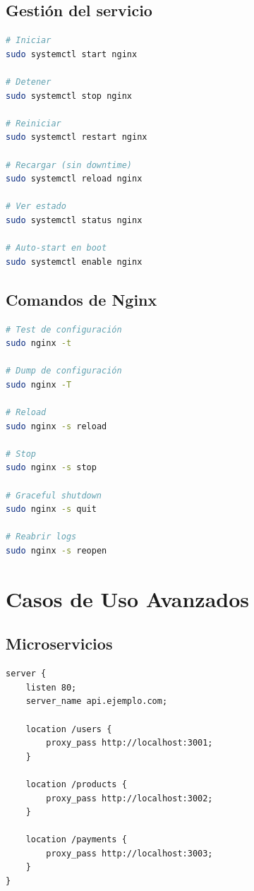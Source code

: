 \documentclass[11pt,a4paper]{article}
\begin{document}
\subsection{Gestión del servicio}

\begin{lstlisting}[language=bash]
# Iniciar
sudo systemctl start nginx

# Detener
sudo systemctl stop nginx

# Reiniciar
sudo systemctl restart nginx

# Recargar (sin downtime)
sudo systemctl reload nginx

# Ver estado
sudo systemctl status nginx

# Auto-start en boot
sudo systemctl enable nginx
\end{lstlisting}

\subsection{Comandos de Nginx}

\begin{lstlisting}[language=bash]
# Test de configuración
sudo nginx -t

# Dump de configuración
sudo nginx -T

# Reload
sudo nginx -s reload

# Stop
sudo nginx -s stop

# Graceful shutdown
sudo nginx -s quit

# Reabrir logs
sudo nginx -s reopen
\end{lstlisting}

\section{Casos de Uso Avanzados}

\subsection{Microservicios}

\begin{lstlisting}
server {
    listen 80;
    server_name api.ejemplo.com;
    
    location /users {
        proxy_pass http://localhost:3001;
    }
    
    location /products {
        proxy_pass http://localhost:3002;
    }
    
    location /payments {
        proxy_pass http://localhost:3003;
    }
}
\end{lstlisting}
\end{document}
